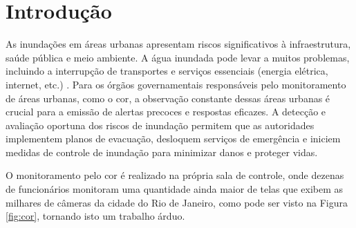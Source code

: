 



\chapter{Introdução}
\label{cap:introducao}

As inundações em áreas urbanas apresentam riscos significativos à infraestrutura, saúde pública e meio ambiente. A água inundada pode levar a muitos problemas, incluindo a interrupção de transportes e serviços essenciais (energia elétrica, internet, etc.) . Para os órgãos governamentais responsáveis pelo monitoramento de áreas urbanas, como o \acrfull{cor}, a observação constante dessas áreas urbanas é crucial para a emissão de alertas precoces e respostas eficazes. A detecção e avaliação oportuna dos riscos de inundação permitem que as autoridades implementem planos de evacuação, desloquem serviços de emergência e iniciem medidas de controle de inundação para minimizar danos e proteger vidas.

O monitoramento pelo \acrshort{cor} é realizado na própria sala de controle, onde dezenas de funcionários monitoram uma quantidade ainda maior de telas que exibem as milhares de câmeras da cidade do Rio de Janeiro, como pode ser visto na Figura \ref{fig:cor}, tornando isto um trabalho árduo.



